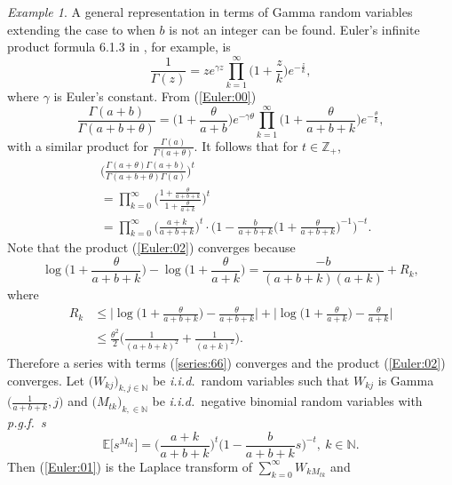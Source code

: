 \documentclass[preprint,11pt]{elsarticle}
\theoremstyle{remark}
\newtheorem{Example}{Example}
\def\pgf{\emph{p.g.f.~}}
\def\iid{\emph{i.i.d.}~}
\begin{document}
{\begin{Example}
A general representation in terms of Gamma random variables extending the case to when $b$ is not an integer can be found. Euler's infinite product formula 6.1.3 in \cite{AS1972}, for example, is
\begin{equation} 
\frac{1}{\Gamma(z)} = ze^{\gamma z}\prod_{k=1}^\infty\big ( 1 + \frac{z}{k}\big )e^{-\frac{z}{k}},
\label{Euler:00}
\end{equation}
where $\gamma$ is Euler's constant. From (\ref{Euler:00})
\begin{equation*}
\frac{\Gamma(a+b)}{\Gamma(a+b+\theta)}
= \big ( 1 + \frac{\theta}{a+b}\big ) e^{-\gamma \theta}
\prod_{k=1}^\infty\big ( 1 + \frac{\theta}{a+b+k}\big )e^{-\frac{\theta}{k}},
\end{equation*}
with a similar product for $\frac{\Gamma(a)}{\Gamma(a+\theta)}$. 
It follows that for $t\in \mathbb{Z}_+$,
\begin{align}
&\Bigg (\frac{\Gamma(a+\theta)\Gamma(a+b)}{\Gamma(a+b+\theta)\Gamma(a)}\Bigg )^t\nonumber \\
&=\prod_{k=0}^\infty \Bigg (\frac{1 + \frac{\theta}{a+b+k}}{1 + \frac{\theta}{a+k}}\Bigg )^t\label{Euler:02}\\
&= \prod_{k=0}^\infty \Big (\frac{a+k}{a+b+k}\Big )^t
\cdot \Big ( 1 - \frac{b}{a+b+k}\Big (1 + \frac{\theta}{a+b+k}\Big )^{-1}\Big )^{-t}.
\label{Euler:01}
\end{align}
Note that the product (\ref{Euler:02}) converges because
\begin{equation}
\log \Big (1 + \frac{\theta}{a+b+k}\Big )
-\log \Big (1 + \frac{\theta}{a+k}\Big ) 
= \frac{-b}{(a+b+k)(a+k)} + R_k,
\label{series:66}
\end{equation}
where 
\begin{align*}
R_k &\leq \Big |\log \Big (1 + \frac{\theta}{a+b+k}\Big ) - \frac{\theta}{a+b+k}\Big |
+ \Big |\log \Big (1 + \frac{\theta}{a+k}\Big ) - \frac{\theta}{a+k}\Big |\\
&\leq \frac{\theta^2}{2}\Big (\frac{1}{(a+b+k)^2} + \frac{1}{(a+k)^2}\Big ).
\end{align*}
Therefore a series with terms (\ref{series:66}) converges and the product (\ref{Euler:02}) converges.
Let $\big (W_{kj}\big )_{k,j\in \mathbb{N}}$ be \iid random variables such that
$W_{kj}$ is Gamma$\Big (\frac{1}{a+b+k},j\Big )$ and $\big (M_{tk}\big )_{k,\in \mathbb{N}}$ be \iid negative binomial random variables with \pgf\emph{s}
\[
\mathbb{E}\Big [s^{M_{tk}}\Big ] =
\Big (\frac{a+k}{a+b+k}\Big )^t\Big (1 - \frac{b}{a+b+k}s\Big )^{-t},\ k \in \mathbb{N}.
\] 
Then (\ref{Euler:01}) is the Laplace transform of $\sum_{k=0}^\infty W_{kM_{tk}}$ and

\end{Example}}
\end{document}
